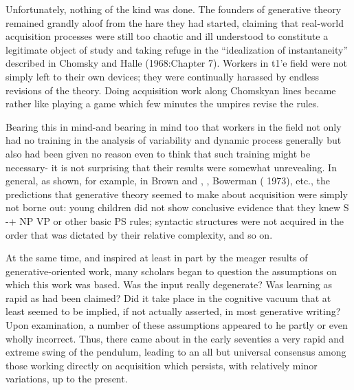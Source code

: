 Unfortunately, nothing of the kind was done. The founders of generative theory remained grandly aloof from the hare they had started, claiming that real-world acquisition processes were still too chaotic and ill understood to constitute a legitimate object of study and taking refuge in the ``idealization of instantaneity'' described in Chomsky and Halle (1968:Chapter 7). Workers in t1'e field were not simply left to their own devices; they were continually harassed by endless revisions of the theory. Doing acquisition work along Chom\-skyan lines became rather like playing a game which few minutes the umpires revise the rules.

Bearing this in mind-and bearing in mind too that workers in the field not only had no training in the analysis of variability and dynamic process generally but also had been given no reason even to think that such training might be necessary- it is not surprising that their results were somewhat unrevealing. In general, as shown, for example, in Brown and \citet{Hanlon1970}, \citet{Brown1973}, Bowerman ( 1973), etc., the predictions that generative theory seemed to make about acquisition were simply not borne out: young children did not
show conclusive evidence that they knew S {}-+ NP VP or other basic PS
rules; syntactic structures were not acquired in the order that was dictated by their relative complexity, and so on.

At the same time, and inspired at least in part by the meager results of generative-oriented work, many scholars began to question the assumptions on which this work was based. Was the input really degenerate? Was learning as rapid as had been claimed? Did it take place in the cognitive vacuum that at least seemed to be implied, if not actually asserted, in most generative writing? Upon examination, a number of these assumptions appeared to he partly or even wholly incorrect. Thus, there came about in the early seventies a very rapid and extreme swing of the pendulum, leading to an all but universal consensus among those working directly on acquisition which persists, with relatively minor variations, up to the present.

